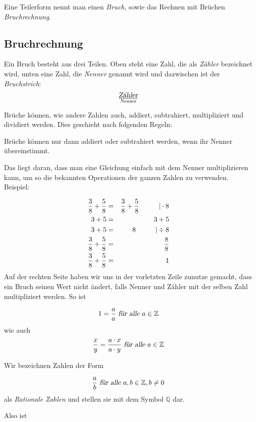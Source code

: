 \begin{definition}
Eine Teilerform nennt man einen \textsl{Bruch}, sowie das Rechnen mit Brüchen \textsl{Bruchrechnung}.
\end{definition}

\subsection{Bruchrechnung}

\begin{definition}
Ein Bruch besteht aus drei Teilen. Oben steht eine Zahl, die als \textsl{Zähler} bezeichnet wird, unten eine Zahl, die \textsl{Nenner} genannt wird und dazwischen ist der \textsl{Bruchstrich}:
\[ \textsl{Zähler} \over \textsl{Nenner} \]
\end{definition}

Brüche können, wie andere Zahlen auch, addiert, subtrahiert, multipliziert und dividiert werden. Dies geschieht nach folgenden Regeln:

\begin{definition}
Brüche können nur dann addiert oder subtrahiert werden, wenn ihr Nenner übereinstimmt. 
\end{definition}

Das liegt daran, dass man eine Gleichung einfach mit dem Nenner multiplizieren kann, um so die bekannten Operationen der ganzen Zahlen zu verwenden. Beispiel:

\begin{eqnarray*}
{3\over 8}+{5\over 8} &=& {3\over 8}+{5\over 8} \hskip 1cm | \cdot 8 \\
3 +5 &=& 3+5 \\
3+5 &=& 8 \hskip 1cm | \div 8\\
{3\over 8}+{5\over 8} &=& {8\over 8} \\
{3\over 8}+{5\over 8} &=& 1
\end{eqnarray*}
Auf der rechten Seite haben wir uns in der vorletzten Zeile zunutze gemacht, dass ein Bruch seinen Wert nicht ändert, falls Nenner und Zähler mit der selben Zahl multipliziert werden. So ist 

\[ 1 = {a \over a} \textsl{ für alle } a\in \mathbb{Z} \]
wie auch 
\begin{equation}
\label{relation}
{x\over y} = {a\cdot x \over a\cdot y} \textsl{ für alle } a\in \mathbb{Z}
\end{equation}

\begin{definition}
Wir bezeichnen Zahlen der Form 

\[ {a\over b} \textsl{ für alle } a,b \in \mathbb{Z}, b\ne 0\]
als \textsl{Rationale Zahlen} und stellen sie mit dem Symbol $\mathbb{Q}$ dar. 
\end{definition}
Also ist 


